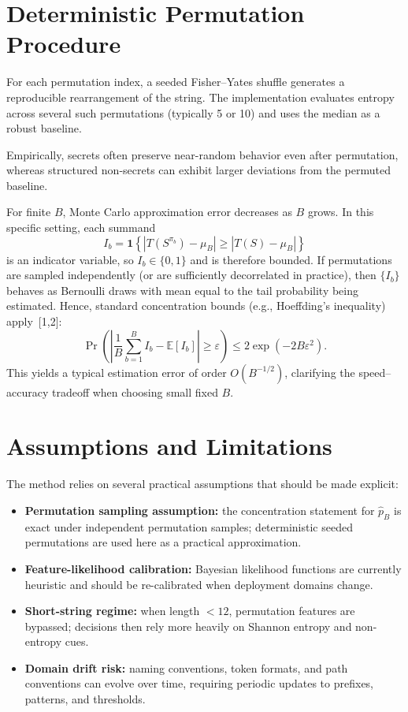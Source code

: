 \documentclass[10pt]{article}
\begin{document}
\section*{Deterministic Permutation Procedure}

For each permutation index, a seeded Fisher--Yates shuffle generates a reproducible rearrangement of the string. The implementation evaluates entropy across several such permutations (typically 5 or 10) and uses the median as a robust baseline.

Empirically, secrets often preserve near-random behavior even after permutation, whereas structured non-secrets can exhibit larger deviations from the permuted baseline.

For finite $B$, Monte Carlo approximation error decreases as $B$ grows. In this specific setting, each summand
\[
I_b = \mathbf{1}\!\left\{\left|T(S^{\pi_b})-\mu_B\right| \geq \left|T(S)-\mu_B\right|\right\}
\]
is an indicator variable, so $I_b\in\{0,1\}$ and is therefore bounded. If permutations are sampled independently (or are sufficiently decorrelated in practice), then $\{I_b\}$ behaves as Bernoulli draws with mean equal to the tail probability being estimated. Hence, standard concentration bounds (e.g., Hoeffding's inequality) apply~[1,2]:
\[
\Pr\!\left(\left|\frac{1}{B}\sum_{b=1}^B I_b - \mathbb{E}[I_b]\right|\ge \varepsilon\right)
\le 2\exp(-2B\varepsilon^2).
\]
This yields a typical estimation error of order $O(B^{-1/2})$, clarifying the speed--accuracy tradeoff when choosing small fixed $B$.

\section*{Assumptions and Limitations}

The method relies on several practical assumptions that should be made explicit:
\begin{itemize}
  \item \textbf{Permutation sampling assumption:} the concentration statement for $\hat p_B$ is exact under independent permutation samples; deterministic seeded permutations are used here as a practical approximation.
  \item \textbf{Feature-likelihood calibration:} Bayesian likelihood functions are currently heuristic and should be re-calibrated when deployment domains change.
  \item \textbf{Short-string regime:} when length $<12$, permutation features are bypassed; decisions then rely more heavily on Shannon entropy and non-entropy cues.
  \item \textbf{Domain drift risk:} naming conventions, token formats, and path conventions can evolve over time, requiring periodic updates to prefixes, patterns, and thresholds.
\end{itemize}
\end{document}
